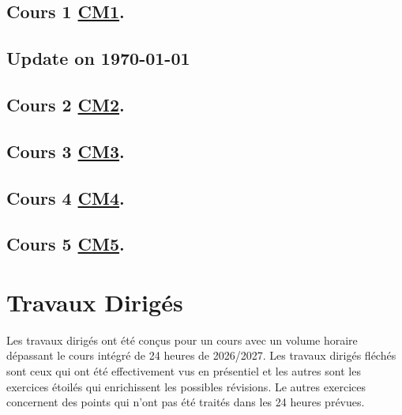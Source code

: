 \documentclass[ 12pt]{article}
\begin{document}
\subsection{Cours 1
  \href{http://mery54.github.io/teaching/mvsi/lecturesnotes/mvsilecture1.pdf}{CM1}. }



\subsection{Update on \today}
\label{sec:update-today}



\subsection{Cours 2
  \href{http://mery54.github.io/teaching/mvsi/lecturesnotes/mvsilecture2.pdf}{CM2}. }


\subsection{Cours 3
  \href{http://mery54.github.io/teaching/mvsi/lecturesnotes/mvsilecture3.pdf}{CM3}. }



\subsection{Cours 4
  \href{http://mery54.github.io/teaching/mvsi/lecturesnotes mvsilecture4.pdf}{CM4}. }




\subsection{Cours 5
  \href{http://mery54.github.io/teaching/mvsi/lecturesnotes/mvsilecture5.pdf}{CM5}. }





  

\section{Travaux Dirigés}

Les travaux dirigés ont été conçus pour un cours     avec un volume
horaire  dépassant le cours intégré  de 24 heures de 2026/2027.   Les
travaux dirigés fléchés  sont ceux qui ont été effectivement  vus en
présentiel et les autres sont les  exercices    étoilés  qui
enrichissent  les possibles révisions.  Le autres exercices concernent
des  points  qui  n'ont pas été traités dans les 24 heures prévues. 
\end{document}

